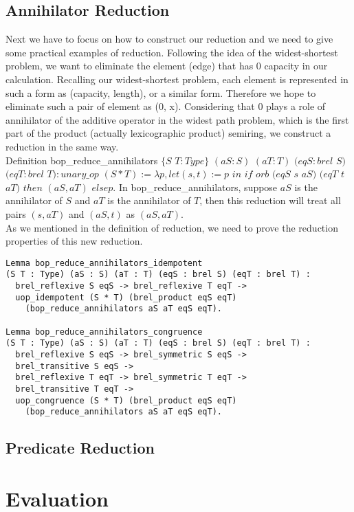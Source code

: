 \documentclass[a4paper,12pt,twoside,openright]{report}
\begin{document}
\section{Annihilator Reduction}
Next we have to focus on how to construct our reduction and we need to give some practical examples of reduction.
Following the idea of the widest-shortest problem, we want to eliminate the element (edge) that has 0 capacity in our calculation. 
Recalling our widest-shortest problem, each element is represented in such a form as (capacity, length), or a similar form. Therefore we hope to eliminate such a pair of element as (0, x). Considering that 0 plays a role of annihilator of the additive operator in the widest path problem, which is the first part of the product (actually lexicographic product) semiring, we construct a reduction in the same way.\\
Definition bop\_reduce\_annihilators $\{S$ $T : Type\}$ $(aS : S)$ $(aT : T)$ $(eqS : brel$ $S)$ $(eqT : brel$ $ T) : unary\_op$ $ (S * T)
  := \lambda p, let (s, t) := p$ $ in $ $if$ $ orb $ $(eqS$ $ s $ $aS) $ $(eqT $ $t $ $aT)$ $ then $ $(aS, aT) $ $else p.$
In bop\_reduce\_annihilators, suppose $aS$ is the annihilator of $S$ and $aT$ is the annihilator of $T$, then this reduction will treat all pairs $(s,aT)$ and $(aS,t)$ as $(aS,aT)$.\\
As we mentioned in the definition of reduction, we need to prove the reduction properties of this new reduction.
\begin{lstlisting}
Lemma bop_reduce_annihilators_idempotent 
(S T : Type) (aS : S) (aT : T) (eqS : brel S) (eqT : brel T) :
  brel_reflexive S eqS -> brel_reflexive T eqT -> 
  uop_idempotent (S * T) (brel_product eqS eqT) 
  	(bop_reduce_annihilators aS aT eqS eqT).

Lemma bop_reduce_annihilators_congruence 
(S T : Type) (aS : S) (aT : T) (eqS : brel S) (eqT : brel T) :
  brel_reflexive S eqS -> brel_symmetric S eqS -> 
  brel_transitive S eqS -> 
  brel_reflexive T eqT -> brel_symmetric T eqT -> 
  brel_transitive T eqT -> 
  uop_congruence (S * T) (brel_product eqS eqT) 
  	(bop_reduce_annihilators aS aT eqS eqT).
\end{lstlisting}
\section{Predicate Reduction}
\chapter{Evaluation} 
\end{document}
